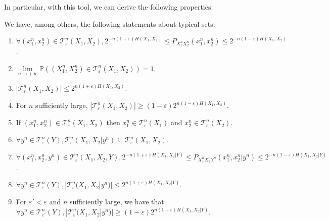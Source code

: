      In particular, with this tool, we can derive the following properties:
      
      \begin{proposition}
        We have, among others, the following statements about typical sets:
        \begin{enumerate}
        \item $\forall (x_1^n,x_2^n) \in \mathcal{T}^n_{\varepsilon}(X_1,X_2), 2^{-n(1+\varepsilon)H(X_1,X_2)} \leq P_{X_1^nX_2^n}(x_1^n,x_2^n) \leq 2^{-n(1-\varepsilon)H(X_1,X_2)}$.
        \item $\underset{n \rightarrow +\infty}{\lim} \mathbb{P}\left((X_1^n,X_2^n) \in \mathcal{T}^n_{\varepsilon}(X_1,X_2) \right) = 1$.
        \item $|\mathcal{T}^n_{\varepsilon}(X_1,X_2)| \leq 2^{n(1+\varepsilon)H(X_1,X_2)}$.
        \item For $n$ sufficiently large, $|\mathcal{T}^n_{\varepsilon}(X_1,X_2)| \geq (1-\varepsilon)2^{n(1-\varepsilon)H(X_1,X_2)}$.
        \item If $(x_1^n,x_2^n) \in \mathcal{T}^n_{\varepsilon}(X_1,X_2)$ then $x_1^n \in \mathcal{T}^n_{\varepsilon}(X_1)$ and $x_2^n \in \mathcal{T}^n_{\varepsilon}(X_2)$.
        \item $\forall y^n \in \mathcal{T}^n_{\varepsilon}(Y), \mathcal{T}^n_{\varepsilon}(X_1,X_2|y^n) \subseteq \mathcal{T}^n_{\varepsilon}(X_1,X_2)$.
        \item $\forall (x_1^n,x_2^n,y^n) \in \mathcal{T}^n_{\varepsilon}(X_1,X_2,Y), 2^{-n(1+\varepsilon)H(X_1,X_2|Y)} \leq P_{X_1^nX_2^nY^n}(x_1^n,x_2^n|y^n) \leq 2^{-n(1-\varepsilon)H(X_1,X_2|Y)}$.
        \item $\forall y^n \in \mathcal{T}^n_{\varepsilon}(Y), |\mathcal{T}^n_{\varepsilon}(X_1,X_2|y^n)| \leq 2^{n(1+\varepsilon)H(X_1,X_2|Y)}$.
        \item For $\varepsilon' < \varepsilon$ and $n$ sufficiently large, we have that $\forall y^n \in \mathcal{T}^n_{\varepsilon'}(Y), |\mathcal{T}^n_{\varepsilon}(X_1,X_2|y^n)| \geq (1-\varepsilon)2^{n(1-\varepsilon)H(X_1,X_2|Y)}$.
        \end{enumerate}
      \end{proposition}
